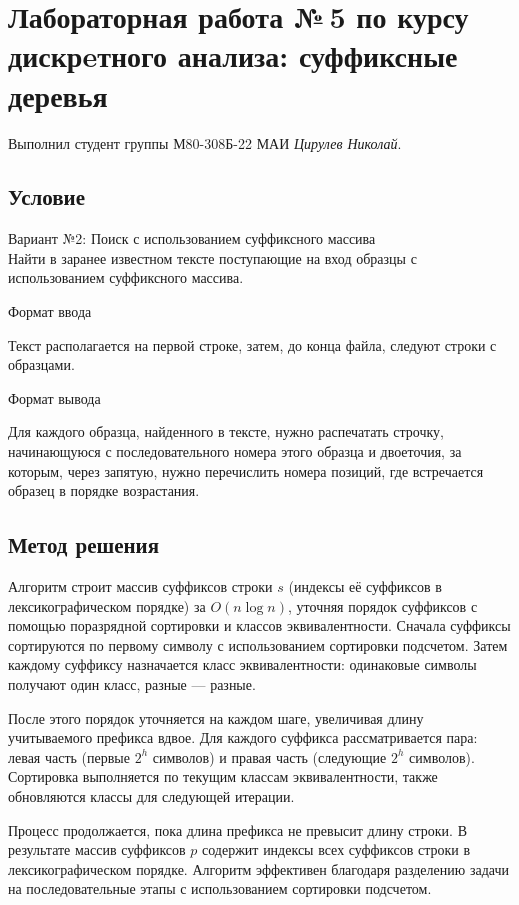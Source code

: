 \documentclass[12pt]{article}
\begin{document}
\section*{Лабораторная работа №\,5 по курсу дискрeтного анализа: суффиксные деревья}

Выполнил студент группы М80-308Б-22 МАИ \textit{Цирулев Николай}.

\subsection*{Условие}
Вариант №2: Поиск с использованием суффиксного массива\\
Найти в заранее известном тексте поступающие на вход образцы с использованием суффиксного массива. 

Формат ввода

Текст располагается на первой строке, затем, до конца файла, следуют строки с образцами.

Формат вывода

Для каждого образца, найденного в тексте, нужно распечатать строчку, начинающуюся с последовательного номера этого образца и двоеточия, за которым, через запятую, нужно перечислить номера позиций, где встречается образец в порядке возрастания. 

\subsection*{Метод решения}
Алгоритм строит массив суффиксов строки $s$ (индексы её суффиксов в лексикографическом порядке) за $O(n \log n)$, уточняя порядок суффиксов с помощью поразрядной сортировки и классов эквивалентности. Сначала суффиксы сортируются по первому символу с использованием сортировки подсчетом. Затем каждому суффиксу назначается класс эквивалентности: одинаковые символы получают один класс, разные — разные.  

После этого порядок уточняется на каждом шаге, увеличивая длину учитываемого префикса вдвое. Для каждого суффикса рассматривается пара: левая часть (первые $2^h$ символов) и правая часть (следующие $2^h$ символов). Сортировка выполняется по текущим классам эквивалентности, также обновляются классы для следующей итерации.  

Процесс продолжается, пока длина префикса не превысит длину строки. В результате массив суффиксов $p$ содержит индексы всех суффиксов строки в лексикографическом порядке. Алгоритм эффективен благодаря разделению задачи на последовательные этапы с использованием сортировки подсчетом.  
\end{document}
